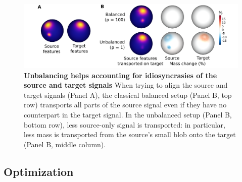 \begin{figure}[t]
    \centering
    \includegraphics[width=1\columnwidth]{./Chapitre4/figures/toy_example.pdf}
    \caption{
        \textbf{Unbalancing helps accounting for idiosyncrasies of the source and target signals}
        When trying to align the source and target signals (Panel A),
        the classical balanced setup (Panel B, top row) transports all parts of
        the source signal even if they have no counterpart in the target signal.
        In the unbalanced setup (Panel B, bottom row), less source-only signal is transported:
        in particular, less mass is transported from the source's small blob onto the target
        (Panel B, middle column).
    }
    \label{fig:toy_example}
\end{figure}

\subsection{Optimization}

